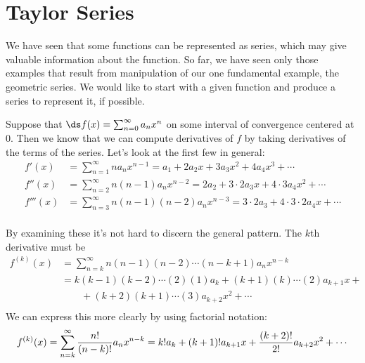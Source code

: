 \section{Taylor Series}\label{sec:taylorseries}








































We have seen that some functions can be represented as series, which
may give valuable information about the function. So far, we have seen
only those examples that result from manipulation of our one
fundamental example, the geometric series. We would like to start with
a given function and produce a series to represent it, if possible.

Suppose that $\ds f(x)=\sum_{n=0}^\infty a_nx^n$ on some interval of
convergence centered at 0. Then we know that we can compute derivatives of $f$ by
taking derivatives of the terms of the series. Let's look at the first
few in general:
\begin{align*}
  f'(x)&=\sum_{n=1}^\infty n a_n x^{n-1}=a_1 + 2a_2x+3a_3x^2+4a_4x^3+\cdots	\\
  f''(x)&=\sum_{n=2}^\infty n(n-1) a_n x^{n-2}=2a_2+3\cdot2a_3x
    +4\cdot3a_4x^2+\cdots	\\
  f'''(x)&=\sum_{n=3}^\infty n(n-1)(n-2) a_n x^{n-3}=3\cdot2a_3
    +4\cdot3\cdot2a_4x+\cdots	\\
\end{align*}

By examining these it's not hard to discern the general pattern. The
$k$th derivative must be
\begin{align*}
  f^{(k)}(x)&=\sum_{n=k}^\infty n(n-1)(n-2)\cdots(n-k+1)a_nx^{n-k}	\\
  &=k(k-1)(k-2)\cdots(2)(1)a_k+(k+1)(k)\cdots(2)a_{k+1}x+{}	\\
  &\qquad {}+(k+2)(k+1)\cdots(3)a_{k+2}x^2+\cdots	\\
\end{align*}
We can express this more clearly by using factorial notation:
\[
  f^{(k)}(x)=\sum_{n=k}^\infty {n!\over (n-k)!}a_nx^{n-k}=
  k!a_k+(k+1)!a_{k+1}x+{(k+2)!\over 2!}a_{k+2}x^2+\cdots
\]

